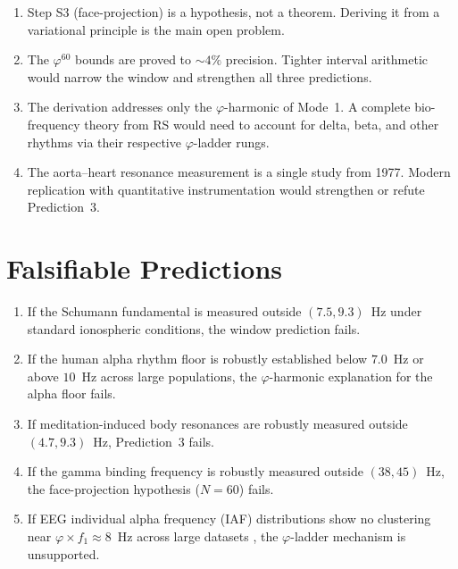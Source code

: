 \documentclass[11pt,a4paper]{article}
\begin{document}
\begin{enumerate}
  \item Step S3 (face-projection) is a hypothesis, not a theorem.
    Deriving it from a variational principle is the main open problem.
  \item The $\varphi^{60}$ bounds are proved to $\sim 4\%$ precision.
    Tighter interval arithmetic would narrow the window and strengthen
    all three predictions.
  \item The derivation addresses only the $\varphi$-harmonic of Mode~1.
    A complete bio-frequency theory from RS would need to account for
    delta, beta, and other rhythms via their respective
    $\varphi$-ladder rungs.
  \item The aorta--heart resonance measurement is a single study
    from 1977. Modern replication with quantitative instrumentation
    would strengthen or refute Prediction~3.
\end{enumerate}

\section{Falsifiable Predictions}
\label{sec:falsify}

\begin{enumerate}[label=\textbf{F\arabic*.}]
  \item If the Schumann fundamental is measured outside $(7.5,9.3)$~Hz
    under standard ionospheric conditions, the window prediction fails.
  \item If the human alpha rhythm floor is robustly established below
    $7.0$~Hz or above $10$~Hz across large populations, the
    $\varphi$-harmonic explanation for the alpha floor fails.
  \item If meditation-induced body resonances are robustly measured
    outside $(4.7,9.3)$~Hz, Prediction~3 fails.
  \item If the gamma binding frequency is robustly measured outside
    $(38,45)$~Hz, the face-projection hypothesis ($N=60$) fails.
  \item If EEG individual alpha frequency (IAF) distributions show no
    clustering near $\varphi \times f_1 \approx 8$~Hz across large
    datasets \citep{grandy2013}, the $\varphi$-ladder mechanism is
    unsupported.
\end{enumerate}

\end{document}
